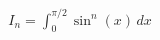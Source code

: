 \documentclass[preview]{standalone}
\begin{document}
\begin{align*}
I_n = \int_0^{\pi/2} \sin^n(x) \, dx
\end{align*}
\end{document}
